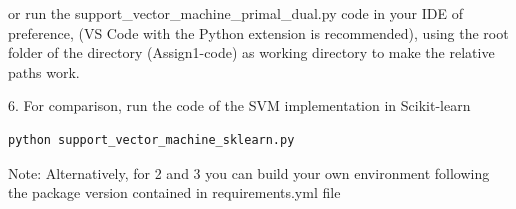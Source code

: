 \documentclass[11pt,twocolumn,letterpaper]{article}
\begin{document}
or run the support\_vector\_machine\_primal\_dual.py code in your IDE of preference, (VS Code with the Python extension is recommended), using the root folder of the directory (Assign1-code) as working directory to make the relative paths work.

6. For comparison, run the code of the SVM implementation in Scikit-learn
\begin{verbatim}
python support_vector_machine_sklearn.py
\end{verbatim}
Note: Alternatively, for 2 and 3 you can build your own environment following the package version contained in requirements.yml file
\end{document}
